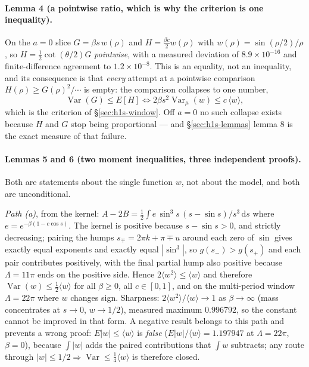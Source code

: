 
\paragraph{Lemma 4 (a pointwise ratio, which is why the criterion is one inequality).} On the $a=0$
slice $G=\beta s\,w(\rho)$ and $H=\tfrac{\beta c}{2}w(\rho)$ with $w(\rho)=\sin(\rho/2)/\rho$, so
$H=\tfrac12\cot(\theta/2)G$ \emph{pointwise}, with a measured deviation of $8.9\times10^{-16}$ and
finite-difference agreement to $1.2\times10^{-8}$. This is an equality, not an inequality, and its
consequence is that \emph{every} attempt at a pointwise comparison $H(\rho)\ge G(\rho)^{2}/\cdots$ is
empty: the comparison collapses to one number,
\begin{equation}
\operatorname{Var}(G)\le E[H]\iff 2\beta s^{2}\operatorname{Var}_{\mu}(w)\le c\,\langle w\rangle ,
\label{eq:h1s-crit}
\end{equation}
which is the criterion of \S\ref{sec:h1s-window}. Off $a=0$ no such collapse exists because $H$ and
$G$ stop being proportional --- and \S\ref{sec:h1s-lemmas} lemma 8 is the exact measure of that
failure. \LT


\paragraph{Lemmas 5 and 6 (two moment inequalities, three independent proofs).} Both are statements
about the single function $w$, not about the model, and both are unconditional.

\emph{Path (a)}, from the kernel: $A-2B=\tfrac12\int e\,\sin^{3}s\,(s-\sin s)/s^{3}\,\mathrm{d} s$ where
$e=e^{-\beta(1-c\cos s)}$. The kernel is positive because $s-\sin s>0$, and strictly decreasing;
pairing the humps $s_{\mp}=2\pi k+\pi\mp u$ around each zero of $\sin$ gives exactly equal exponents
and exactly equal $|\sin^{3}|$, so $g(s_{-})>g(s_{+})$ and each pair contributes positively, with the
final partial hump also positive because $\Lambda=11\pi$ ends on the positive side. Hence
$2\langle w^{2}\rangle\le\langle w\rangle$ and therefore $\operatorname{Var}(w)\le\tfrac12\langle w\rangle$
for all $\beta\ge0$, all $c\in[0,1]$, and on the multi-period window $\Lambda=22\pi$ where $w$
changes sign. Sharpness: $2\langle w^{2}\rangle/\langle w\rangle\to1$ as $\beta\to\infty$
(mass concentrates at $s\to0$, $w\to1/2$), measured maximum $0.996792$, so the constant cannot be
improved in that form. A negative result belongs to this path and prevents a wrong proof:
$E|w|\le\langle w\rangle$ is \emph{false} ($E|w|/\langle w\rangle=1.197947$ at $\Lambda=22\pi$,
$\beta=0$), because $\int|w|$ adds the paired contributions that $\int w$ subtracts; any route through
$|w|\le1/2\Rightarrow\operatorname{Var}\le\tfrac14\langle w\rangle$ is therefore closed.

